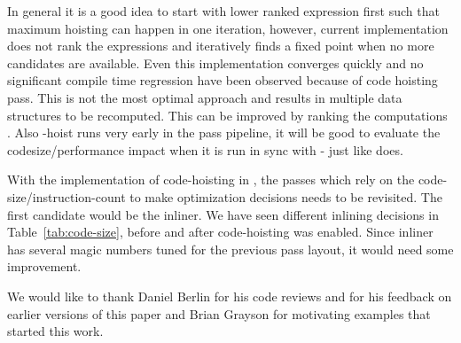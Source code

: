 \documentclass[acmlarge,review,anonymous]{acmart}\settopmatter{printfolios=true}
\begin{document}
In general it is a good idea to start with lower ranked expression first such
that maximum hoisting can happen in one iteration, however, current
implementation does not rank the expressions and iteratively finds a fixed point
when no more candidates are available. Even this implementation converges
quickly and no significant compile time regression have been observed because of
code hoisting pass. This is not the most optimal approach and results in
multiple data structures to be recomputed. This can be improved by ranking the
computations \cite{rosen1988global}. Also \GVN{}-hoist runs very early in the
pass pipeline, it will be good to evaluate the codesize/performance impact when
it is run in sync with \GVN{}-\PRE{} just like \GCC{} does.

With the implementation of code-hoisting in \LLVM{}, the passes which rely on the
code-size/instruction-count to make optimization decisions needs to be
revisited. The first candidate would be the inliner. We have seen different
inlining decisions in Table~\ref{tab:code-size}, before and after
code-hoisting was enabled.  Since inliner has several magic numbers tuned for
the previous pass layout, it would need some improvement.

\begin{acks}                            %
We would like to thank Daniel Berlin for his code reviews and for his feedback
on earlier versions of this paper and Brian Grayson for motivating examples that
started this work.
\end{acks}




\end{document}

